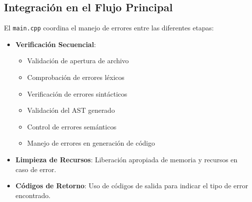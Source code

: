 \documentclass[11pt, a4paper, twoside]{article} %
\begin{document}
\subsection{Integración en el Flujo Principal}

El \texttt{main.cpp} coordina el manejo de errores entre las diferentes etapas:

\begin{itemize}
    \item \textbf{Verificación Secuencial}:
    \begin{itemize}
        \item Validación de apertura de archivo
        \item Comprobación de errores léxicos
        \item Verificación de errores sintácticos
        \item Validación del AST generado
        \item Control de errores semánticos
        \item Manejo de errores en generación de código
    \end{itemize}
    \item \textbf{Limpieza de Recursos}: Liberación apropiada de memoria y recursos en caso de error.
    \item \textbf{Códigos de Retorno}: Uso de códigos de salida para indicar el tipo de error encontrado.
\end{itemize}
\end{document}
